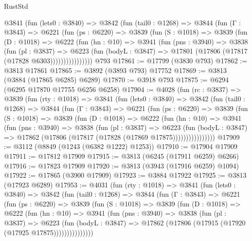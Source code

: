 \begin{lexlean}{RustStd}
\begin{coremodule}
        @3841
          (fun (lets0 : @3840) =>
          @3842
            (fun (tail0 : @1268) =>
            @3844
              (fun (Γ : @3843) =>
              @6221
                (fun (ps : @6220) =>
                @3839
                  (fun (S : @1018) =>
                  @3839
                    (fun (D : @1018) =>
                    @6222
                      (fun (hn : @10) =>
                      @3941
                        (fun (pns : @3940) =>
                        @3838
                          (fun (pl : @3837) =>
                          @6223
                            (fun (bodyL : @3847) =>
                            @17801 (@17806 (@17817 (@17828 @6303))))))))))))))))
    @793
@17861 := @17799 (@3830 @793)
@17862 := @3813 @17861
@17865 := @3892 (@3893 @793) @17752
@17869 := @3813 (@3884 (@17865 @6285) @6289)
@17870 := @3918 @793
@17875 := @6294 (@6295 @17870 @17755 @6256 @6258)
@17904 := @4028
    (fun (rc : @3837) =>
    @3839
      (fun (rty : @1018) =>
      @3841
        (fun (lets0 : @3840) =>
        @3842
          (fun (tail0 : @1268) =>
          @3844
            (fun (Γ : @3843) =>
            @6221
              (fun (ps : @6220) =>
              @3839
                (fun (S : @1018) =>
                @3839
                  (fun (D : @1018) =>
                  @6222
                    (fun (hn : @10) =>
                    @3941
                      (fun (pns : @3940) =>
                      @3838
                        (fun (pl : @3837) =>
                        @6223
                          (fun (bodyL : @3847) =>
                          @17862 (@17806 (@17817 (@17828 (@17869 @17875))))))))))))))))
@17909 := @3112 (@8849 (@1243 (@6382 @1222) @1253))
@17910 := @17904 @17909
@17911 := @17812 @17909
@17915 := @3813 (@6245 (@17911 @6259) @6266)
@17916 := @17823 @17909
@17920 := @3813 (@3943 (@17916 @6259) @1094)
@17922 := @17865 (@3900 @17909)
@17923 := @3884 @17922
@17925 := @3813 (@17923 @6289)
@17953 := @4031
    (fun (rty : @1018) =>
    @3841
      (fun (lets0 : @3840) =>
      @3842
        (fun (tail0 : @1268) =>
        @3844
          (fun (Γ : @3843) =>
          @6221
            (fun (ps : @6220) =>
            @3839
              (fun (S : @1018) =>
              @3839
                (fun (D : @1018) =>
                @6222
                  (fun (hn : @10) =>
                  @3941
                    (fun (pns : @3940) =>
                    @3838
                      (fun (pl : @3837) =>
                      @6223
                        (fun (bodyL : @3847) =>
                        @17862 (@17806 (@17915 (@17920 (@17925 @17875)))))))))))))))

\end{coremodule}
\end{lexlean}

